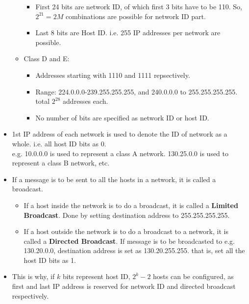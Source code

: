 \documentclass{article}
\begin{document}
\begin{itemize}
\begin{itemize}
\begin{itemize}
				\item First 24 bits are network ID, of which first 3 bits have to be 110. So, $2^{21}=2M$ combinations are possible for network ID part.
				\item Last 8 bits are Host ID. i.e. 255 IP addresses per network are possible.
			\end{itemize}
			\item Class D and E: \begin{itemize}
				\item Addresses starting with 1110 and 1111 repsectively.
				\item Range: 224.0.0.0-239.255.255.255, and 240.0.0.0 to 255.255.255.255. total $2^{28}$ addresses each.
				\item No number of bits are specified as network ID or host ID.
			\end{itemize}
		\end{itemize}
		\item 1st IP address of each network is used to denote the ID of network as a whole. i.e. all host ID bits as 0.\\
		e.g. 10.0.0.0 is used to represent a class A network. 130.25.0.0 is used to represent a class B network, etc.
		\item If a message is to be sent to all the hosts in a network, it is called a broadcast. \begin{itemize}
			\item If a host inside the network is to do a broadcast, it is called a \textbf{Limited Broadcast}. Done by setting destination address to 255.255.255.255.
			\item If a host outside the network is to do a broadcast to a network, it is called a \textbf{Directed Broadcast}. If message is to be broadcasted to e.g. 130.20.0.0, destination address is set as 130.20.255.255. that is, set all the host ID bits as 1.
		\end{itemize}
		\item This is why, if $k$ bits represent host ID, $2^k-2$ hosts can be configured, as first and last IP address is reserved for network ID and directed broadcast respectively.
	\end{itemize}
\end{document}
